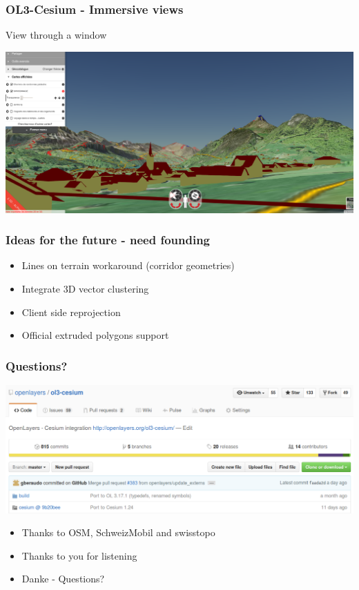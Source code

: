\documentclass[handout]{beamer}
\begin{document}
  \begin{frame}
    \frametitle{OL3-Cesium - Immersive views}
    View through a window
    \begin{center}
      \includegraphics[width=\linewidth]{./images/geoadmin_immersive_view_from_home.png}
    \end{center}
  \end{frame}


  \begin{frame}
    \frametitle{Ideas for the future - need founding}
    \begin{itemize}
      \item Lines on terrain workaround (corridor geometries)
        \pause
      \item Integrate 3D vector clustering
        \pause
      \item Client side reprojection
        \pause
      \item Official extruded polygons support
    \end{itemize}
  \end{frame}


  \begin{frame}
    \frametitle{Questions?}
    \vspace{-20pt}\begin{center}
      \includegraphics[width=0.9\linewidth]{images/github_contribute.png}
    \end{center}
    \begin{itemize}
      \item Thanks to OSM, SchweizMobil and swisstopo
        \pause
      \item Thanks to you for listening
        \pause
      \item Danke - Questions?
    \end{itemize}
  \end{frame}
\end{document}
